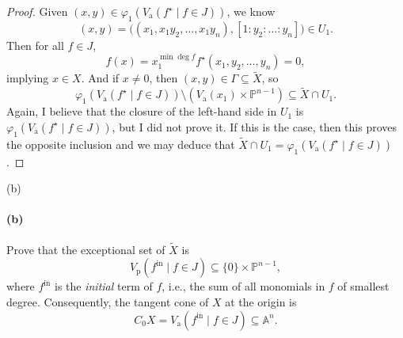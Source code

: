 \documentclass[12pt]{article}
\newenvironment{fullbox}{\begin{lrbox}{\savefullbox}\begin{minipage}{\dimexpr\textwidth-2\fboxsep\relax}}{\end{minipage}\end{lrbox}\begin{center}\framebox[\textwidth]{\usebox{\savefullbox}}\end{center}}
\newenvironment{pbox}[1][]{\begin{fullbox}\ifx#1\empty\else\paragraph{#1}\fi}{\end{fullbox}}
\theoremstyle{definition}
\renewcommand{\phi}{\varphi}
\newcommand{\<}{\langle}
\renewcommand{\>}{\rangle}
\newcommand{\Vp}{V_{\mathrm{p}}}
\newcommand{\Va}{V_{\mathrm{a}}}
\newcommand{\A}{\mathbb{A}}
\renewcommand{\P}{\mathbb{P}}
\newcommand{\blow}{\widetilde}
\newcommand{\init}{\mathrm{in}}
\newcommand{\belt}[2]{\big((#1), [#2]\big)}
\begin{document}
\begin{proof}
    Given $(x, y) \in \phi_1(\Va(f^\star \mid f \in J))$, we know
    \[
        (x, y) = \belt{x_1, x_1y_2, \dots, x_1y_n}{1 : y_2 : \dots : y_n} \in U_1.
    \]
    Then for all $f \in J$,
    \[
        f(x) = x_1^{\min\deg f}f^\star(x_1, y_2, \dots, y_n) = 0,
    \]
    implying $x \in X$. And if $x \ne 0$, then $(x, y) \in \Gamma \subseteq \blow{X}$, so
    \[
        \phi_1(\Va(f^\star \mid f \in J)) \setminus (\Va(x_1) \times \P^{n-1}) \subseteq \blow{X} \cap U_1.
    \]
    Again, I believe that the closure of the left-hand side in $U_1$ is $\phi_1(\Va(f^\star \mid f \in J))$, but I did not prove it. If this is the case, then this proves the opposite inclusion and we may deduce that $\blow{X} \cap U_1 = \phi_1(\Va(f^\star \mid f \in J))$.

\end{proof}


\newpage
\begin{pbox}[(b)]
    Prove that the exceptional set of $\blow{X}$ is
    \[
        \Vp(f^\init \mid f \in J) \subseteq \{0\} \times \P^{n-1},
    \]
    where $f^\init$ is the \textit{initial} term of $f$, i.e., the sum of all monomials in $f$ of smallest degree. Consequently, the tangent cone of $X$ at the origin is
    \[
        C_0X = \Va(f^\init \mid f \in J) \subseteq \A^n.
    \]
\end{pbox}
\end{document}

